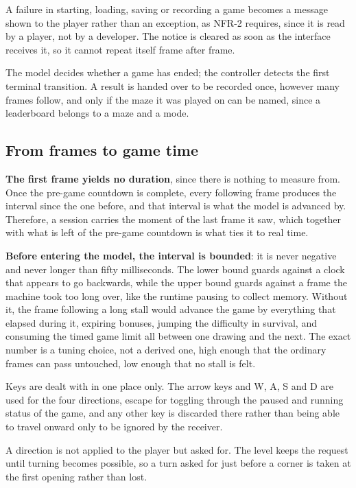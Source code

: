 A failure in starting, loading, saving or recording a game becomes a message shown to the player rather than an exception, as NFR-2 requires, since it is read by a player, not by a developer. The notice is cleared as soon as the interface receives it, so it cannot repeat itself frame after frame.

The model decides whether a game has ended; the controller detects the first terminal transition. A result is handed
over to be recorded once, however many frames follow, and only if the maze it was played on can be named, since a leaderboard
belongs to a maze and a mode.

\subsection{From frames to game time}

\textbf{The first frame yields no duration}, since there is nothing to measure from. Once the pre-game countdown is complete,
every following frame produces the interval since the one before, and that interval is what the model is advanced by. Therefore, a session
carries the moment of the last frame it saw, which together with what is left of the pre-game countdown is what
ties it to real time.

\textbf{Before entering the model, the interval is bounded}: it is never negative and never longer than fifty milliseconds.
The lower bound guards against a clock that appears to go backwards, while the upper bound guards against a frame
the machine took too long over, like the runtime pausing to collect memory. Without it, the frame following a long
stall would advance the game by everything that elapsed during it, expiring bonuses, jumping the difficulty in survival,
and consuming the timed game limit all between one drawing and the next. The exact number is a tuning choice, not a
derived one, high enough that the ordinary frames can pass untouched, low enough that no stall is felt.

Keys are dealt with in one place only. The arrow keys and W, A, S and D are used for the four directions, escape for
toggling through the paused and running status of the game, and any other key is discarded there rather than being
able to travel onward only to be ignored by the receiver.

A direction is not applied to the player but asked for. The level keeps the request until turning becomes possible,
so a turn asked for just before a corner is taken at the first opening rather than lost.

